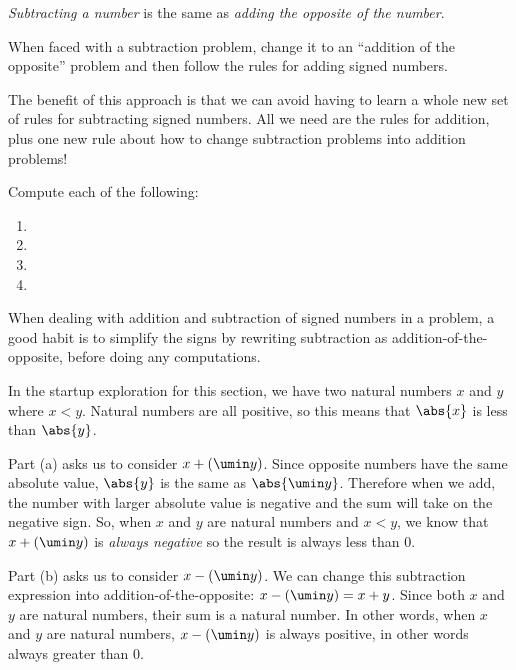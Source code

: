 \begin{boxeddef}
\textit{Subtracting a number} is the same as \textit{adding the opposite of the number}.

When faced with a subtraction problem, change it to an ``addition of the opposite'' problem and then follow the rules for adding signed numbers.
\end{boxeddef}

The benefit of this approach is that we can avoid having to learn a whole new set of rules for subtracting signed numbers. All we need are the rules for addition, plus one new rule about how to change subtraction problems into addition problems!

\begin{boxedex}
Compute each of the following:

\begin{enumerate}[itemsep=10pt]
\item {}

\item {}

\item {}

\item {}
\end{enumerate}
\end{boxedex}

When dealing with addition and subtraction of signed numbers in a problem, a good habit is to simplify the signs by rewriting subtraction as addition-of-the-opposite, before doing any computations.

\begin{boxedex}
In the startup exploration for this section, we have two natural numbers $x$ and $y$ where $x < y$. Natural numbers are all positive, so this means that $\abs{x}$ is less than $\abs{y}$.

Part (a) asks us to consider $x+(\umin y)$. Since opposite numbers have the same absolute value, $\abs{y}$ is the same as $\abs{\umin y}$. Therefore when we add, the number with larger absolute value is negative and the sum will take on the negative sign. So, when $x$ and $y$ are natural numbers and $x < y$, we know that $x+(\umin y)$ is \textit{always negative} so the result is always less than 0.

Part (b) asks us to consider $x-(\umin y)$. We can change this subtraction expression into addition-of-the-opposite: $x-(\umin y) = x+y$. Since both $x$ and $y$ are natural numbers, their sum is a natural number. In other words, when $x$ and $y$ are natural numbers, $x-(\umin y)$ is always positive, in other words always greater than 0.
\end{boxedex}

